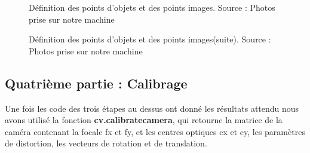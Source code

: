  	 \begin{figure}[H]%
 		\center%
 		\setlength{\fboxsep}{5pt}%
 		\setlength{\fboxrule}{0.5pt}%
 		\caption[Définition des points d'objets et points images]{Définition des points d'objets et des points images. Source : Photos prise sur notre machine}
 		\label{fig:Définition des points d'objets et des points images}
 	\end{figure}
 	
 	\begin{figure}[H]%
 		\center%
 		\setlength{\fboxsep}{5pt}%
 		\setlength{\fboxrule}{0.5pt}%
 		\caption[Définition des points d'objets et points images(suite)]{Définition des points d'objets et des points images(suite). Source : Photos prise sur notre machine}
 		\label{fig:Définition des points d'objets et des points images(suite)}
 	\end{figure}
 	
  
 \subsection{Quatrième partie : Calibrage}\label{subsec:Calibrage}
 
 Une fois les code des trois étapes au dessus ont donné les résultats attendu nous avons utilisé la fonction \textbf{cv.calibratecamera}, qui retourne la matrice de la caméra contenant la focale fx et fy, et les centres optiques cx et cy, les paramètres de distortion, les vecteurs de rotation et de translation.
 

